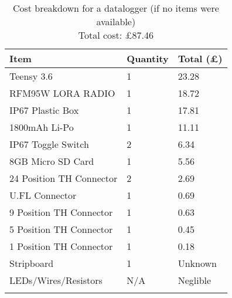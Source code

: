 \begin{table}[H]
\centering
\caption[Cost breakdown for a project datalogger]{Cost breakdown for a datalogger (if no items were available) \\ Total cost: \pounds87.46}
\label{fig:datalogger_cost}
\begin{tabular}{p{6cm}|p{2cm}|p{3cm}}
\toprule
\textbf{Item} & \textbf{Quantity} & \textbf{Total (\pounds)} \\
\midrule
Teensy 3.6 & 1 & 23.28 \\
RFM95W LORA RADIO & 1 & 18.72 \\
IP67 Plastic Box & 1 & 17.81 \\
1800mAh Li-Po & 1 & 11.11 \\
IP67 Toggle Switch & 2 & 6.34 \\
8GB Micro SD Card & 1 & 5.56 \\
24 Position TH Connector & 2 & 2.69 \\
U.FL Connector & 1 & 0.69 \\
9 Position TH Connector & 1 & 0.63 \\
5 Position TH Connector & 1 & 0.45 \\
1 Position TH Connector & 1 & 0.18 \\
Stripboard & 1 & Unknown \\
LEDs/Wires/Resistors & N/A & Neglible \\
\addlinespace\bottomrule
\end{tabular}
\end{table}